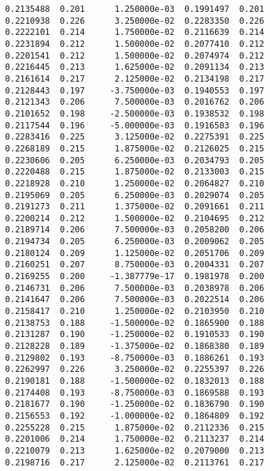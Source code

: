 \documentclass[
  letterpaper,
  DIV=11,
  numbers=noendperiod]{scrartcl}
\begin{document}
\begin{verbatim}
  0.2135488  0.201      1.250000e-03  0.1991497  0.201           
  0.2210938  0.226      3.250000e-02  0.2283350  0.226           
  0.2222101  0.214      1.750000e-02  0.2116639  0.214           
  0.2231894  0.212      1.500000e-02  0.2077410  0.212           
  0.2201541  0.212      1.500000e-02  0.2074974  0.212           
  0.2216445  0.213      1.625000e-02  0.2091134  0.213           
  0.2161614  0.217      2.125000e-02  0.2134198  0.217           
  0.2128443  0.197     -3.750000e-03  0.1940553  0.197           
  0.2121343  0.206      7.500000e-03  0.2016762  0.206           
  0.2101652  0.198     -2.500000e-03  0.1938532  0.198           
  0.2117544  0.196     -5.000000e-03  0.1916503  0.196           
  0.2283416  0.225      3.125000e-02  0.2275391  0.225           
  0.2268189  0.215      1.875000e-02  0.2126025  0.215           
  0.2230606  0.205      6.250000e-03  0.2034793  0.205           
  0.2220488  0.215      1.875000e-02  0.2133003  0.215           
  0.2218928  0.210      1.250000e-02  0.2064827  0.210           
  0.2195069  0.205      6.250000e-03  0.2029074  0.205           
  0.2191273  0.211      1.375000e-02  0.2091661  0.211           
  0.2200214  0.212      1.500000e-02  0.2104695  0.212           
  0.2189714  0.206      7.500000e-03  0.2058200  0.206           
  0.2194734  0.205      6.250000e-03  0.2009062  0.205           
  0.2180124  0.209      1.125000e-02  0.2051706  0.209           
  0.2160251  0.207      8.750000e-03  0.2004331  0.207           
  0.2169255  0.200     -1.387779e-17  0.1981978  0.200           
  0.2146731  0.206      7.500000e-03  0.2038978  0.206           
  0.2141647  0.206      7.500000e-03  0.2022514  0.206           
  0.2158417  0.210      1.250000e-02  0.2103950  0.210           
  0.2138753  0.188     -1.500000e-02  0.1865900  0.188           
  0.2131287  0.190     -1.250000e-02  0.1910533  0.190           
  0.2128228  0.189     -1.375000e-02  0.1868380  0.189           
  0.2129802  0.193     -8.750000e-03  0.1886261  0.193           
  0.2262997  0.226      3.250000e-02  0.2255397  0.226           
  0.2190181  0.188     -1.500000e-02  0.1832013  0.188           
  0.2174408  0.193     -8.750000e-03  0.1869588  0.193           
  0.2181677  0.190     -1.250000e-02  0.1836790  0.190           
  0.2156553  0.192     -1.000000e-02  0.1864809  0.192           
  0.2255228  0.215      1.875000e-02  0.2112336  0.215           
  0.2201006  0.214      1.750000e-02  0.2113237  0.214           
  0.2210079  0.213      1.625000e-02  0.2079000  0.213           
  0.2198716  0.217      2.125000e-02  0.2113761  0.217           

\end{verbatim}
\end{document}
